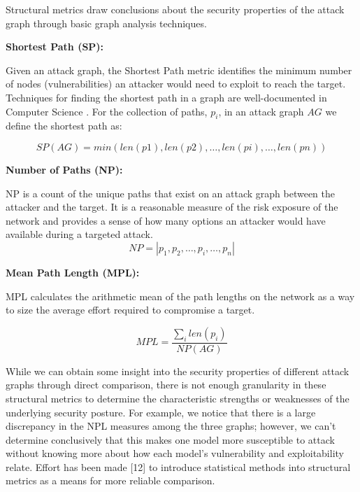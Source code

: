 
Structural metrics draw conclusions about the security properties of the attack graph through basic graph analysis techniques\cite{Dacier_Deswarte_Kaaniche}\cite{Ortalo_1999}.  

\textbf{Shortest Path (SP):  }

Given an attack graph, the Shortest Path metric identifies the minimum number of nodes (vulnerabilities) an attacker would need to exploit to reach the target. Techniques for finding the shortest path in a graph are well-documented in Computer Science \cite{Dijkstra_1959}.  For the collection of paths, \(p_i\), in an attack graph \(AG\) we define the shortest path as: 

\[SP(AG) = min(len(p1), len(p2), \ldots, len(pi), \ldots, len(pn)) \]


\textbf{Number of Paths (NP):}  

NP is a count of the unique paths that exist on an attack graph between the attacker and the target. It is a reasonable measure of the risk exposure of the network and provides a sense of how many options an attacker would have available during a targeted attack.  
\[NP = |p_1, p_2, \ldots, p_i, \ldots, p_n| \] 

\textbf{Mean Path Length (MPL): }

MPL calculates the arithmetic mean of the path lengths on the network as a way to size the average effort required to compromise a target.  

\[MPL = \frac{\sum_{i}len(p_i)}{NP(AG)}\]
 

 

While we can obtain some insight into the security properties of different attack graphs through direct comparison, there is not enough granularity in these structural metrics to determine the characteristic strengths or weaknesses of the underlying security posture. For example, we notice that there is a large discrepancy in the NPL measures among the three graphs; however, we can’t determine conclusively that this makes one model more susceptible to attack without knowing more about how each model’s vulnerability and exploitability relate. Effort has been made [12] to introduce statistical methods into structural metrics as a means for more reliable comparison. 
